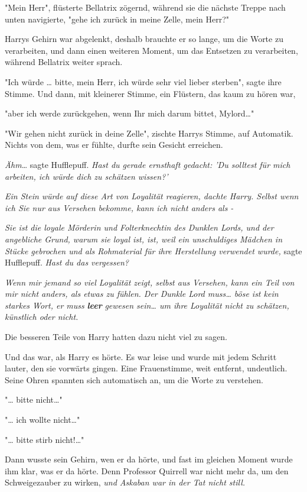 {"Mein Herr", flüsterte Bellatrix zögernd, während sie die nächste Treppe nach unten navigierte, "gehe ich zurück in meine Zelle, mein Herr?"

Harrys Gehirn war abgelenkt, deshalb brauchte er so lange, um die Worte zu verarbeiten, und dann einen weiteren Moment, um das Entsetzen zu verarbeiten, während Bellatrix weiter sprach.

"Ich würde … bitte, mein Herr, ich würde sehr viel lieber sterben", sagte ihre Stimme. Und dann, mit kleinerer Stimme, ein Flüstern, das kaum zu hören war,

"aber ich werde zurückgehen, wenn Ihr mich darum bittet, Mylord…"

"Wir gehen nicht zurück in deine Zelle", zischte Harrys Stimme, auf Automatik. Nichts von dem, was er fühlte, durfte sein Gesicht erreichen.

\emph{Ähm}… sagte Hufflepuff. \emph{Hast du gerade ernsthaft gedacht: 'Du solltest für mich arbeiten, ich würde dich zu schätzen wissen?'}

\emph{Ein Stein würde auf diese Art von Loyalität reagieren, dachte Harry. Selbst wenn ich Sie nur aus Versehen bekomme, kann ich nicht anders als -}

\emph{Sie ist die loyale Mörderin und Folterknechtin des Dunklen Lords, und der angebliche Grund, warum sie loyal ist, ist, weil ein unschuldiges Mädchen in Stücke gebrochen und als Rohmaterial für ihre Herstellung verwendet wurde,} sagte Hufflepuff. \emph{Hast du das vergessen?}

\emph{Wenn mir jemand so viel Loyalität zeigt, selbst aus Versehen, kann ein Teil von mir nicht anders, als etwas zu fühlen. Der Dunkle Lord muss… böse ist kein starkes Wort, er muss} \textbf{\emph{leer}} \emph{gewesen sein… um ihre Loyalität nicht zu schätzen, künstlich oder nicht.}

Die besseren Teile von Harry hatten dazu nicht viel zu sagen.

Und das war, als Harry es hörte. Es war leise und wurde mit jedem Schritt lauter, den sie vorwärts gingen. Eine Frauenstimme, weit entfernt, undeutlich. Seine Ohren spannten sich automatisch an, um die Worte zu verstehen.

"… bitte nicht…"

"… ich wollte nicht…"

"… bitte stirb nicht!…"

Dann wusste sein Gehirn, wen er da hörte, und fast im gleichen Moment wurde ihm klar, was er da hörte. Denn Professor Quirrell war nicht mehr da, um den Schweigezauber zu wirken, \emph{und Askaban war in der Tat nicht still.}

}
